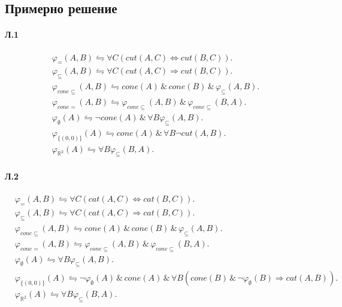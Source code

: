 \documentclass[12pt]{article}
\begin{document}
\newpage
\subsection{Примерно решение}
\paragraph{\hspace{0.5em} Л.1}
\begin{addmargin}[1em]{2em}
\begin{align*}
    &\varphi_{=}(A, B) \leftrightharpoons \forall C (cut(A,C) \iff cut(B, C)).&\\
    &\varphi_{\subseteq}(A, B) \leftrightharpoons \forall C (cut(A,C) \Longrightarrow cut(B, C)).&\\
    &\varphi_{cone\subseteq}(A, B) \leftrightharpoons cone(A) \,\&\, cone(B) \,\&\, \varphi_{\subseteq}(A, B).&\\
    &\varphi_{cone=}(A, B) \leftrightharpoons \varphi_{cone\subseteq}(A, B) \,\&\, \varphi_{cone\subseteq}(B, A).&\\
    &\varphi_{\emptyset}(A) \leftrightharpoons \neg cone(A) \,\&\, \forall B \varphi_{\subseteq}(A, B).&\\
    &\varphi_{\{(0,0)\}}(A) \leftrightharpoons cone(A) \,\&\, \forall B \neg cut(A, B).&\\
    &\varphi_{\mathbb{R}^2}(A) \leftrightharpoons \forall B \varphi_{\subseteq}(B, A).&
\end{align*}
\end{addmargin}

\paragraph{\hspace{0.5em} Л.2}
\begin{addmargin}[1em]{2em}
\begin{align*}
    &\varphi_{=}(A, B) \leftrightharpoons \forall C (cat(A,C) \iff cat(B, C)).&\\
    &\varphi_{\subseteq}(A, B) \leftrightharpoons \forall C (cat(A,C) \Longrightarrow cat(B, C)).&\\
    &\varphi_{cone\subseteq}(A, B) \leftrightharpoons cone(A) \,\&\, cone(B) \,\&\, \varphi_{\subseteq}(A, B).&\\
    &\varphi_{cone=}(A, B) \leftrightharpoons \varphi_{cone\subseteq}(A, B) \,\&\, \varphi_{cone\subseteq}(B, A).&\\
    &\varphi_{\emptyset}(A) \leftrightharpoons \forall B \varphi_{\subseteq}(A, B).&\\
    &\varphi_{\{(0,0)\}}(A) \leftrightharpoons \neg\varphi_{\emptyset}(A) \,\&\,  cone(A) \,\&\, \forall B (cone(B) \,\&\, \neg \varphi_{\emptyset}(B) \Longrightarrow cat(A, B)).&\\
    &\varphi_{\mathbb{R}^2}(A) \leftrightharpoons \forall B \varphi_{\subseteq}(B, A).&
\end{align*}
\end{addmargin}
\end{document}

